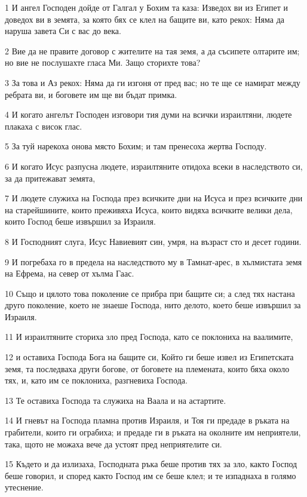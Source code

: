 \par 1 И ангел Господен дойде от Галгал у Бохим та каза: Изведох ви из Египет и доведох ви в земята, за която бях се клел на бащите ви, като рекох: Няма да наруша завета Си с вас до века.
\par 2 Вие да не правите договор с жителите на тая земя, а да съсипете олтарите им; но вие не послушахте гласа Ми. Защо сторихте това?
\par 3 За това и Аз рекох: Няма да ги изгоня от пред вас; но те ще се намират между ребрата ви, и боговете им ще ви бъдат примка.
\par 4 И когато ангелът Господен изговори тия думи на всички израилтяни, людете плакаха с висок глас.
\par 5 За туй нарекоха онова място Бохим; и там пренесоха жертва Господу.
\par 6 И когато Исус разпусна людете, израилтяните отидоха всеки в наследството си, за да притежават земята,
\par 7 И людете служиха на Господа през всичките дни на Исуса и през всичките дни на старейшините, които преживяха Исуса, които видяха всичките велики дела, които Господ беше извършил за Израиля.
\par 8 И Господният слуга, Исус Навиевият син, умря, на възраст сто и десет години.
\par 9 И погребаха го в предела на наследството му в Тамнат-арес, в хълмистата земя на Ефрема, на север от хълма Гаас.
\par 10 Също и цялото това поколение се прибра при бащите си; а след тях настана друго поколение, което не знаеше Господа, нито делото, което беше извършил за Израиля.
\par 11 И израилтяните сториха зло пред Господа, като се поклониха на ваалимите,
\par 12 и оставиха Господа Бога на бащите си, Който ги беше извел из Египетската земя, та последваха други богове, от боговете на племената, които бяха около тях, и, като им се поклониха, разгневиха Господа.
\par 13 Те оставиха Господа та служиха на Ваала и на астартите.
\par 14 И гневът на Господа пламна против Израиля, и Тоя ги предаде в ръката на грабители, които ги ограбиха; и предаде ги в ръката на околните им неприятели, така, щото не можаха вече да устоят пред неприятелите си.
\par 15 Където и да излизаха, Господната ръка беше против тях за зло, както Господ беше говорил, и според както Господ им се беше клел; и те изпаднаха в голямо утеснение.
